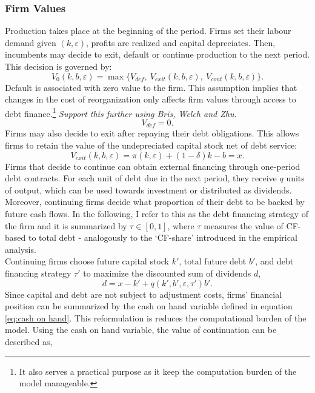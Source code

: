 \documentclass[12pt]{article}
\begin{document}
\subsubsection{Firm Values} \label{sec:Firm Values}
Production takes place at the beginning of the period. Firms set their labour demand given $(k,\varepsilon)$, profits are realized and capital depreciates. Then, incumbents may decide to exit, default or continue production to the next period. This decision is governed by: 
\begin{equation} \label{eq:default decision}
    V_0(k,b,\varepsilon) = \max \{V_{def}, \  V_{exit}(k,b,\varepsilon),  \ V_{cont}(k,b,\varepsilon) \}.
\end{equation}
Default is associated with zero value to the firm. This assumption implies that changes in the cost of reorganization only affects firm values through access to debt finance.\footnote{It also serves a practical purpose as it keep the computation burden of the model manageable.} \textit{Support this further using Bris, Welch and Zhu.}
\begin{equation}
    V_{def} = 0.
\end{equation}
Firms may also decide to exit after repaying their debt obligations. This allows firms to retain the value of the undepreciated capital stock net of debt service: 
\begin{equation}
    V_{exit}(k, b, \varepsilon) = \pi(k,\varepsilon) + (1-\delta)k - b  = x.
\end{equation}
Firms that decide to continue can obtain external financing through one-period debt contracts. For each unit of debt due in the next period, they receive $q$ units of output, which can be used towards investment or distributed as dividends. Moreover, continuing firms decide what proportion of their debt to be backed by future cash flows. In the following, I refer to this as the debt financing strategy of the firm and it is summarized by $\tau \in [0,1]$, where $\tau$ measures the value of CF-based to total debt - analogously to the `CF-share' introduced in the empirical analysis. \vspace{3mm} \\
Continuing firms choose future capital stock $k'$, total future debt $b'$, and debt financing strategy $\tau'$ to maximize the discounted sum of dividends $d$, 
\begin{equation} \label{eq:dividends}
d = x - k' +  q(k',b',\varepsilon, \tau')b'.
\end{equation} 
Since capital and debt are not subject to adjustment costs, firms' financial position can be summarized by the cash on hand variable defined in equation \ref{eq:cash on hand}. This reformulation is reduces the computational burden of the model. Using the cash on hand variable, the value of continuation can be described as,
\end{document}
